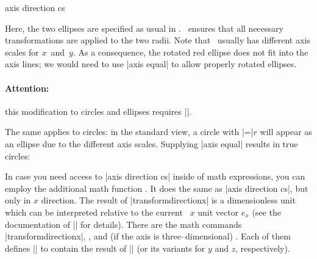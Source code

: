 \begin{coordinatesystem}{axis direction cs}
\begin{codeexample}[]
\end{codeexample}
	Here, the two ellipses are specified as usual in \tikzname. \PGFPlots\ ensures that all necessary transformations are applied to the two radii. Note that \PGFPlots\ usually has different axis scales for $x$~and~$y$. As a consequence, the rotated red ellipse does not fit into the axis lines; we would need to use |axis equal| to allow properly rotated ellipses.

	\paragraph{Attention:} this modification to circles and ellipses requires |\pgfplotsset{compat=1.5.1}|.

	The same applies to circles: in the standard view, a circle with |=|$r$ will appear as an ellipse due to the different axis scales. Supplying |axis equal| results in true circles:
\begin{codeexample}[]
\end{codeexample}
\begin{codeexample}[]
\end{codeexample}

	In case you need access to |axis direction cs| inside of math expressions, you can employ the additional math function . It does the same as |axis direction cs|, but only in $x$ direction. The result of |transformdirectionx| is a dimensionless unit which can be interpreted relative to the current \pgfname\ $x$ unit vector $e_x$ (see the documentation of |\pgfplotstransformdirectionx| for details).
	There are the math commands |transformdirectionx|, , and (if the axis is three--dimensional) . Each of them defines |\pgfmathresult| to contain the result of |\pgfplotstransformdirectionx| (or its variants for $y$ and $z$, respectively).
	
\end{coordinatesystem}


